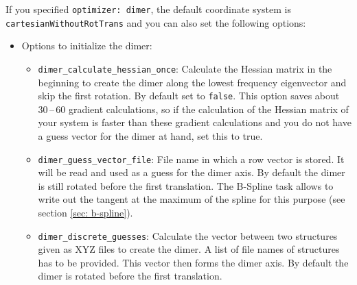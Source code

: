 \documentclass[]{tufte-book}
\begin{document}
If you specified \texttt{optimizer: dimer}, the default coordinate system is \texttt{cartesianWithoutRotTrans}
and you can also set the following options:
\begin{itemize}
\item Options to initialize the dimer:
\begin{itemize}
\item \texttt{dimer\_calculate\_hessian\_once}: Calculate the Hessian matrix in the beginning to create the dimer along the lowest frequency eigenvector and skip the first rotation. By default set to \texttt{false}. This option saves about 30\,--\,60 gradient calculations, so if the calculation of the Hessian matrix of your system is faster than these gradient calculations and you do not have a guess vector for the dimer at hand, set this to true.
\item \texttt{dimer\_guess\_vector\_file}: File name in which a row vector is stored. It will be read and used as a guess for the dimer axis. By default the dimer is still rotated before the first translation. The B-Spline task allows to write out the tangent at the maximum of the spline for this purpose (see section \ref{sec: b-spline}).
\item \texttt{dimer\_discrete\_guesses}: Calculate the vector between two structures given as XYZ files to create the dimer. A list of file names of structures has to be provided. This vector then forms the dimer axis. By default the dimer is rotated before the first translation.


\end{itemize}
\end{itemize}
\end{document}
